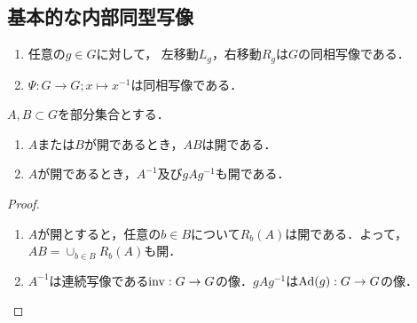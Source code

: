 \documentclass[uplatex,dvipdfmx]{jsreport}
\begin{document}
\subsection{基本的な内部同型写像}

\begin{lemma}\mbox{}
    \begin{enumerate}
        \item 任意の$g\in G$に対して，
        左移動$L_g$，右移動$R_g$は$G$の同相写像である．
        \item $\Psi:G\to G;x\mapsto x^{-1}$は同相写像である．
    \end{enumerate}
\end{lemma}

\begin{lemma}
    $A,B\subset G$を部分集合とする．
    \begin{enumerate}
        \item $A$または$B$が開であるとき，$AB$は開である．
        \item $A$が開であるとき，$A^{-1}$及び$gAg^{-1}$も開である．
    \end{enumerate}
\end{lemma}
\begin{proof}\mbox{}
    \begin{enumerate}
        \item $A$が開とすると，任意の$b\in B$について$R_b(A)$は開である．よって，$AB=\cup_{b\in B}R_b(A)$も開．
        \item $A^{-1}$は連続写像である$\mathrm{inv}:G\to G$の像．$gAg^{-1}$は$\mathrm{Ad}(g):G\to G$の像．
    \end{enumerate}
\end{proof}
\end{document}
